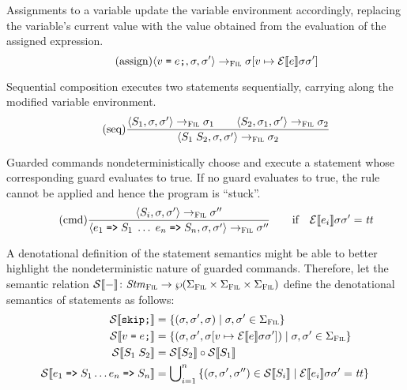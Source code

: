 \documentclass[a4paper,10pt,english]{article}
\begin{document}
Assignments to a variable update the variable environment accordingly, replacing the variable's current value with the value
obtained from the evaluation of the assigned expression.
\begin{equation*}
	\tag{assign}
	\langle v\; \texttt{=}\; e \texttt{;}, \sigma, \sigma' \rangle
		\rightarrow_{\textsc{Fil}}
	\sigma[v \mapsto \mathcal{E} \llbracket e \rrbracket \sigma \sigma']
\end{equation*}

Sequential composition executes two statements sequentially, carrying along the modified variable environment.
\begin{equation*}
	\tag{seq}
	\dfrac
	{
		\langle S_1, \sigma, \sigma' \rangle
			\rightarrow_{\textsc{Fil}}
		\sigma_1
		\qquad
		\langle S_2, \sigma_1, \sigma' \rangle
			\rightarrow_{\textsc{Fil}}
		\sigma_2
	}
	{
		\langle S_1 \; S_2, \sigma, \sigma' \rangle
			\rightarrow_{\textsc{Fil}}
		\sigma_2
	}
\end{equation*}

Guarded commands nondeterministically choose and execute a statement whose corresponding guard evaluates to true. If no guard
evaluates to true, the rule cannot be applied and hence the program is ``stuck''.
\begin{equation*}
	\tag{cmd}
	\dfrac
	{
		\langle S_i, \sigma, \sigma' \rangle
			\rightarrow_{\textsc{Fil}}
		\sigma''
	}
	{
		\langle e_1 \; \texttt{=>} \; S_1 \; \ldots \; e_n \; \texttt{=>} \; S_n, \sigma, \sigma' \rangle
			\rightarrow_{\textsc{Fil}}
		\sigma''
	}
	\qquad \text{if} \quad \mathcal{E} \llbracket e_i \rrbracket \sigma \sigma' = \mathit{tt}
\end{equation*}

A denotational definition of the statement semantics might be able to better highlight the nondeterministic nature of guarded
commands. Therefore, let the semantic relation $\mathcal{S} \llbracket - \rrbracket \colon \mathit{Stm}_\textsc{Fil} \rightarrow \wp (\Sigma_\textsc{Fil} \times \Sigma_\textsc{Fil} \times
\Sigma_\textsc{Fil})$ define the denotational semantics of statements as follows:
\begin{align*}
	\mathcal{S} \llbracket \texttt{skip;} \rrbracket &= \{ (\sigma, \sigma', \sigma) \mid \sigma, \sigma' \in \Sigma_\textsc{Fil} \}
	\\
	\mathcal{S} \llbracket v\; \texttt{=}\; e \texttt{;} \rrbracket &= \{ (\sigma, \sigma', \sigma[v \mapsto \mathcal{E} \llbracket e \rrbracket \sigma
	\sigma']) \mid \sigma, \sigma' \in \Sigma_\textsc{Fil} \}
	\\
	\mathcal{S} \llbracket S_1 \; S_2 \rrbracket &= \mathcal{S} \llbracket S_2 \rrbracket \circ \mathcal{S} \llbracket S_1 \rrbracket
	\\
	\mathcal{S} \llbracket e_1 \; \texttt{=>} \; S_1 \ldots e_n \; \texttt{=>} \; S_n \rrbracket &= 
		\bigcup\nolimits_{i = 1}^n \,
		\{ (\sigma, \sigma', \sigma'') \in \mathcal{S} \llbracket S_i \rrbracket \mid \mathcal{E} \llbracket e_i \rrbracket \sigma \sigma' = \mathit{tt} \}
\end{align*}
\end{document}
